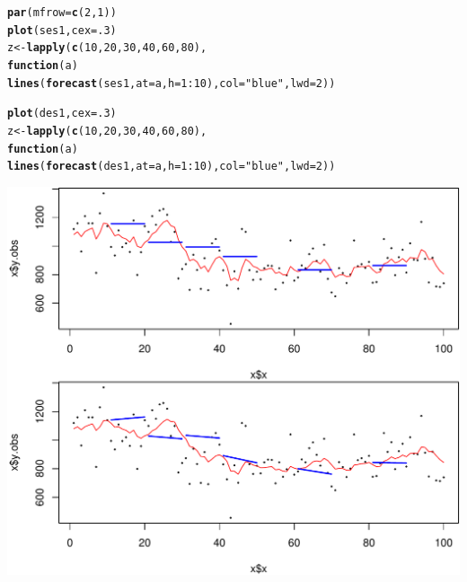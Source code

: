 \documentclass[10pt]{article}\usepackage[]{graphicx}\usepackage[]{color}
\makeatletter
\def\maxwidth{ %
  \ifdim\Gin@nat@width>\linewidth
    \linewidth
  \else
    \Gin@nat@width
  \fi
}
\newcommand{\hlnum}[1]{\textcolor[rgb]{0.686,0.059,0.569}{#1}}%
\newcommand{\hlstr}[1]{\textcolor[rgb]{0.192,0.494,0.8}{#1}}%
\newcommand{\hlopt}[1]{\textcolor[rgb]{0,0,0}{#1}}%
\newcommand{\hlstd}[1]{\textcolor[rgb]{0.345,0.345,0.345}{#1}}%
\newcommand{\hlkwa}[1]{\textcolor[rgb]{0.161,0.373,0.58}{\textbf{#1}}}%
\newcommand{\hlkwb}[1]{\textcolor[rgb]{0.69,0.353,0.396}{#1}}%
\newcommand{\hlkwc}[1]{\textcolor[rgb]{0.333,0.667,0.333}{#1}}%
\newcommand{\hlkwd}[1]{\textcolor[rgb]{0.737,0.353,0.396}{\textbf{#1}}}%
\newenvironment{kframe}{%
 \def\at@end@of@kframe{}%
 \ifinner\ifhmode%
  \def\at@end@of@kframe{\end{minipage}}%
  \begin{minipage}{\columnwidth}%
 \fi\fi%
 \def\FrameCommand##1{\hskip\@totalleftmargin \hskip-\fboxsep
 \colorbox{shadecolor}{##1}\hskip-\fboxsep
     \hskip-\linewidth \hskip-\@totalleftmargin \hskip\columnwidth}%
 \MakeFramed {\advance\hsize-\width
   \@totalleftmargin\z@ \linewidth\hsize
   \@setminipage}}%
 {\par\unskip\endMakeFramed%
 \at@end@of@kframe}
\newenvironment{knitrout}{}{} %
\makeatother
\begin{document}
\begin{knitrout}
\color{fgcolor}\begin{kframe}
\begin{alltt}
\hlkwd{par}\hlstd{(}\hlkwc{mfrow}\hlstd{=}\hlkwd{c}\hlstd{(}\hlnum{2}\hlstd{,}\hlnum{1}\hlstd{))}
\hlkwd{plot}\hlstd{(ses1,} \hlkwc{cex}\hlstd{=}\hlnum{.3}\hlstd{)}
\hlstd{z} \hlkwb{<-} \hlkwd{lapply}\hlstd{(}\hlkwd{c}\hlstd{(}\hlnum{10}\hlstd{,} \hlnum{20}\hlstd{,} \hlnum{30}\hlstd{,} \hlnum{40}\hlstd{,} \hlnum{60}\hlstd{,} \hlnum{80}\hlstd{),}
       \hlkwa{function}\hlstd{(}\hlkwc{a}\hlstd{)}
           \hlkwd{lines}\hlstd{(}\hlkwd{forecast}\hlstd{(ses1,} \hlkwc{at}\hlstd{=a,} \hlkwc{h}\hlstd{=}\hlnum{1}\hlopt{:}\hlnum{10}\hlstd{),} \hlkwc{col}\hlstd{=}\hlstr{"blue"}\hlstd{,} \hlkwc{lwd}\hlstd{=}\hlnum{2}\hlstd{))}

\hlkwd{plot}\hlstd{(des1,} \hlkwc{cex}\hlstd{=}\hlnum{.3}\hlstd{)}
\hlstd{z} \hlkwb{<-} \hlkwd{lapply}\hlstd{(}\hlkwd{c}\hlstd{(}\hlnum{10}\hlstd{,} \hlnum{20}\hlstd{,} \hlnum{30}\hlstd{,} \hlnum{40}\hlstd{,} \hlnum{60}\hlstd{,} \hlnum{80}\hlstd{),}
       \hlkwa{function}\hlstd{(}\hlkwc{a}\hlstd{)}
           \hlkwd{lines}\hlstd{(}\hlkwd{forecast}\hlstd{(des1,} \hlkwc{at}\hlstd{=a,} \hlkwc{h}\hlstd{=}\hlnum{1}\hlopt{:}\hlnum{10}\hlstd{),} \hlkwc{col}\hlstd{=}\hlstr{"blue"}\hlstd{,} \hlkwc{lwd}\hlstd{=}\hlnum{2}\hlstd{))}
\end{alltt}
\end{kframe}
\includegraphics[width=\maxwidth]{fig/graphunnamed-chunk-9-1} 

\end{knitrout}
\end{document}
